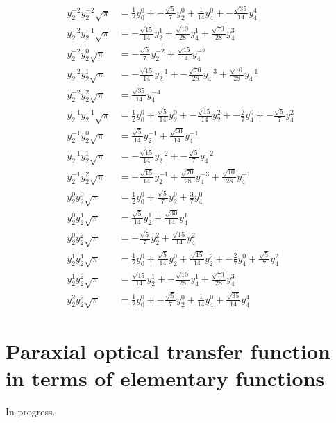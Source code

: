 \documentclass[11pt]{article}
\begin{document}
\begin{align}
y_2^{-2}y_2^{-2}\sqrt{\pi} &= \frac{1}{2 }y_0^{0} + - \frac{\sqrt{5}}{7 }y_2^{0} + \frac{1}{14 }y_4^{0} + - \frac{\sqrt{35}}{14 }y_4^{4} \\
y_2^{-2}y_2^{-1}\sqrt{\pi} &= - \frac{\sqrt{15}}{14 }y_2^{1} + \frac{\sqrt{10}}{28 }y_4^{1} + \frac{\sqrt{70}}{28 }y_4^{3} \\
y_2^{-2}y_2^{0}\sqrt{\pi} &= - \frac{\sqrt{5}}{7 }y_2^{-2} + \frac{\sqrt{15}}{14 }y_4^{-2} \\
y_2^{-2}y_2^{1}\sqrt{\pi} &= - \frac{\sqrt{15}}{14 }y_2^{-1} + - \frac{\sqrt{70}}{28 }y_4^{-3} + \frac{\sqrt{10}}{28 }y_4^{-1} \\
y_2^{-2}y_2^{2}\sqrt{\pi} &= \frac{\sqrt{35}}{14 }y_4^{-4} \\
y_2^{-1}y_2^{-1}\sqrt{\pi} &= \frac{1}{2 }y_0^{0} + \frac{\sqrt{5}}{14 }y_2^{0} + - \frac{\sqrt{15}}{14 }y_2^{2} + - \frac{2}{7 }y_4^{0} + - \frac{\sqrt{5}}{7 }y_4^{2} \\
y_2^{-1}y_2^{0}\sqrt{\pi} &= \frac{\sqrt{5}}{14 }y_2^{-1} + \frac{\sqrt{30}}{14 }y_4^{-1} \\
y_2^{-1}y_2^{1}\sqrt{\pi} &= - \frac{\sqrt{15}}{14 }y_2^{-2} + - \frac{\sqrt{5}}{7 }y_4^{-2} \\
y_2^{-1}y_2^{2}\sqrt{\pi} &= - \frac{\sqrt{15}}{14 }y_2^{-1} + \frac{\sqrt{70}}{28 }y_4^{-3} + \frac{\sqrt{10}}{28 }y_4^{-1} \\
y_2^{0}y_2^{0}\sqrt{\pi} &= \frac{1}{2 }y_0^{0} + \frac{\sqrt{5}}{7 }y_2^{0} + \frac{3}{7 }y_4^{0} \\
y_2^{0}y_2^{1}\sqrt{\pi} &= \frac{\sqrt{5}}{14 }y_2^{1} + \frac{\sqrt{30}}{14 }y_4^{1} \\
y_2^{0}y_2^{2}\sqrt{\pi} &= - \frac{\sqrt{5}}{7 }y_2^{2} + \frac{\sqrt{15}}{14 }y_4^{2} \\
y_2^{1}y_2^{1}\sqrt{\pi} &= \frac{1}{2 }y_0^{0} + \frac{\sqrt{5}}{14 }y_2^{0} + \frac{\sqrt{15}}{14 }y_2^{2} + - \frac{2}{7 }y_4^{0} + \frac{\sqrt{5}}{7 }y_4^{2} \\
y_2^{1}y_2^{2}\sqrt{\pi} &= \frac{\sqrt{15}}{14 }y_2^{1} + - \frac{\sqrt{10}}{28 }y_4^{1} + \frac{\sqrt{70}}{28 }y_4^{3} \\
y_2^{2}y_2^{2}\sqrt{\pi} &= \frac{1}{2 }y_0^{0} + - \frac{\sqrt{5}}{7 }y_2^{0} + \frac{1}{14 }y_4^{0} + \frac{\sqrt{35}}{14 }y_4^{4}
\end{align}
  
\section{Paraxial optical transfer function in terms of elementary functions}\label{paraxialotf}
In progress. 
\end{document}
